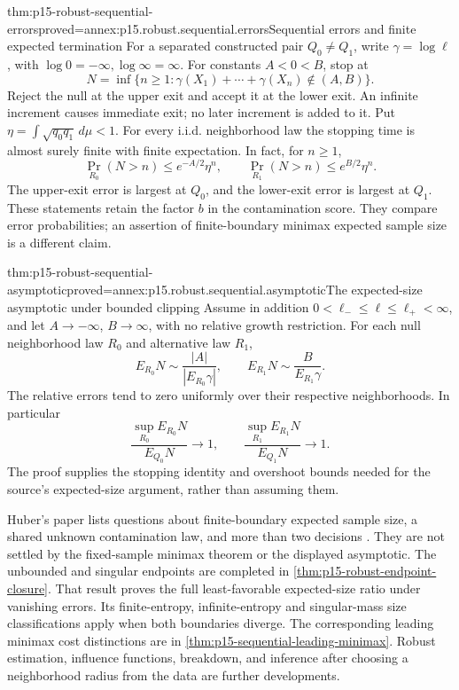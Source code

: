 \begin{hbtheorem}{thm:p15-robust-sequential-errors}{proved=annex:p15.robust.sequential.errors}{Sequential errors and finite expected termination}
For a separated constructed pair \(Q_0\ne Q_1\), write
\(\gamma=\log\ell\), with \(\log0=-\infty,\log\infty=\infty\).
For constants \(A<0<B\), stop at
\[
 N=\inf\{n\geq1:\gamma(X_1)+\cdots+\gamma(X_n)\notin(A,B)\}.
\]
Reject the null at the upper exit and accept it at the lower exit.
An infinite increment causes immediate exit; no later increment is
added to it. Put \(\eta=\int\sqrt{q_0q_1}\,d\mu<1\).
For every i.i.d. neighborhood law the stopping time is almost surely
finite with finite expectation. In fact, for \(n\geq1\),
\[
 \Pr_{R_0}(N>n)\leq e^{-A/2}\eta^n,\qquad
 \Pr_{R_1}(N>n)\leq e^{B/2}\eta^n .
\]
The upper-exit error is largest at
\(Q_0\), and the lower-exit error is largest at \(Q_1\).
These statements retain the factor \(b\) in the contamination score.
They compare error probabilities; an assertion of finite-boundary
minimax expected sample size is a different claim.
\end{hbtheorem}

\begin{hbtheorem}{thm:p15-robust-sequential-asymptotic}{proved=annex:p15.robust.sequential.asymptotic}{The expected-size asymptotic under bounded clipping}
Assume in addition \(0<\ell_-\leq\ell\leq\ell_+<\infty\),
and let \(A\to-\infty\),
\(B\to\infty\), with no relative growth restriction. For each null
neighborhood law \(R_0\) and alternative law \(R_1\),
\[
 E_{R_0}N\sim\frac{|A|}{|E_{R_0}\gamma|},\qquad
 E_{R_1}N\sim\frac{B}{E_{R_1}\gamma}.
\]
The relative errors tend to zero uniformly over their respective
neighborhoods. In particular
\[
 \frac{\sup_{R_0}E_{R_0}N}{E_{Q_0}N}\longrightarrow1,\qquad
 \frac{\sup_{R_1}E_{R_1}N}{E_{Q_1}N}\longrightarrow1.
\]
The proof supplies the stopping identity and overshoot bounds needed
for the source's expected-size argument, rather than assuming them.
\end{hbtheorem}

Huber's paper lists questions about finite-boundary expected sample
size, a shared unknown contamination law, and more than two decisions
\cite[Sec.~8]{Huber1965RobustProbabilityRatio}. They are not settled by
the fixed-sample minimax theorem or the displayed asymptotic.
The unbounded and singular endpoints are completed in
\cref{thm:p15-robust-endpoint-closure}. That result proves the full
least-favorable expected-size ratio under vanishing errors.
Its finite-entropy, infinite-entropy and singular-mass size classifications
apply when both boundaries diverge. The corresponding leading minimax
cost distinctions are in \cref{thm:p15-sequential-leading-minimax}.
Robust estimation, influence functions, breakdown, and inference after
choosing a neighborhood radius from the data are further developments.
